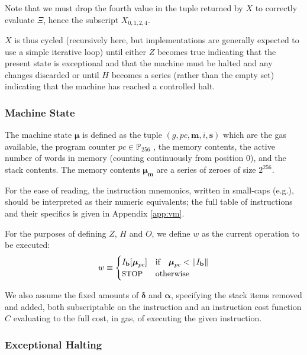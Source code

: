 \documentclass[9pt,oneside]{amsart}
\makeatletter
\newcommand*\eg{e.g.\@\xspace}
\makeatother
\begin{document}
\begin{multicols}{2}
Note that we must drop the fourth value in the tuple returned by $X$ to correctly evaluate $\Xi$, hence the subscript $X_{0,1,2,4}$.

$X$ is thus cycled (recursively here, but implementations are generally expected to use a simple iterative loop) until either $Z$ becomes true indicating that the present state is exceptional and that the machine must be halted and any changes discarded or until $H$ becomes a series (rather than the empty set) indicating that the machine has reached a controlled halt.

\subsubsection{Machine State}
The machine state $\boldsymbol{\mu}$ is defined as the tuple $(g, pc, \mathbf{m}, i, \mathbf{s})$ which are the gas available, the program counter $pc \in \mathbb{P}_{256}$ , the memory contents, the active number of words in memory (counting continuously from position 0), and the stack contents. The memory contents $\boldsymbol{\mu}_\mathbf{m}$ are a series of zeroes of size $2^{256}$.

For the ease of reading, the instruction mnemonics, written in small-caps (\eg {}), should be interpreted as their numeric equivalents; the full table of instructions and their specifics is given in Appendix \ref{app:vm}.

For the purposes of defining $Z$, $H$ and $O$, we define $w$ as the current operation to be executed:
\begin{equation}\label{eq:currentoperation}
w \equiv \begin{cases} I_\mathbf{b}[\boldsymbol{\mu}_{pc}] & \text{if} \quad \boldsymbol{\mu}_{pc} < \lVert I_\mathbf{b} \rVert \\
\text{\small STOP} & \text{otherwise}
\end{cases}
\end{equation}

We also assume the fixed amounts of $\mathbf{\delta}$ and $\mathbf{\alpha}$, specifying the stack items removed and added, both subscriptable on the instruction and an instruction cost function $C$ evaluating to the full cost, in gas, of executing the given instruction.

\subsubsection{Exceptional Halting}


\end{multicols}
\end{document}
